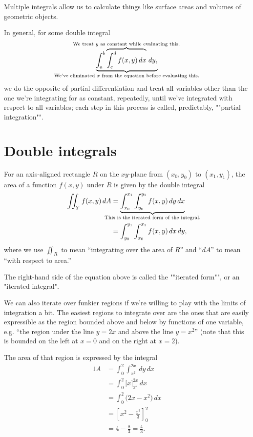 \documentclass[knowledge]{rbt-mathnotes}
\begin{document}
Multiple integrals allow us to calculate things like surface areas and
volumes of geometric objects.

In general, for some double integral
\[\underbrace{\int_a^b \overbrace{\int_c^d f(x,y)\,dx}^{\mathclap{\text{We
treat $y$ as constant while evaluating this.}}}\,dy,}_{\mathclap{\text{We've
eliminated $x$ from the equation before evaluating this.}}}\]
we do the opposite of partial differentiation and treat all variables other
than the one we're integrating for as constant, repeatedly, until we've
integrated with respect to all variables; each step in this process is
called, predictably, ""partial integration"".

\section{Double integrals}
For an axis-aligned rectangle $R$ on the $xy$-plane from $(x_0, y_0)$ to $(x_1,
y_1)$, the area of a function $f(x, y)$ under $R$ is given by the double
integral
\begin{alignat*}{1}
  \iint_{Y} f(x,y)\,dA &= \underbrace{\int_{x_0}^{x_1} \int_{y_0}^{y_1}
    f(x,y)\,dy\,dx}_{\mathclap{\text{This is the iterated form of the
    integral.}}} \\
    &= \int_{y_0}^{y_1} \int_{x_0}^{x_1} f(x,y)\,dx\,dy, \\
\end{alignat*}
where we use $\iint_R$ to mean ``integrating over the area of $R$'' and
``$dA$'' to mean ``with respect to area.''

The right-hand side of the equation above is called the ""iterated form"",
or an \reintro*"iterated integral".

We can also iterate over funkier regions if we're willing to play with the
limits of integration a bit. The easiest regions to integrate over are the
ones that are easily expressible as the region bounded above and below by
functions of one variable, e.g. ``the region under the line $y = 2x$ and
above the line $y = x^2$'' (note that this is bounded on the left at $x = 0$
and on the right at $x = 2$).

The area of that region is expressed by the integral
\begin{alignat*}{1}
  A &= \int_0^2 \int_{x^2}^{2x}\,dy\,dx \\
    &= \int_0^2 {\bigg[ x \bigg]}_{x^2}^{2x}\,dx \\
    &= \int_0^2 {\bigg( 2x-x^2 \bigg)}\,dx \\
    &= {\left[ x^2 - \frac{x^3}{3} \right]}_0^2 \\
    &= 4 - \frac{8}{3} = \frac{4}{3}.
\end{alignat*}
\end{document}
